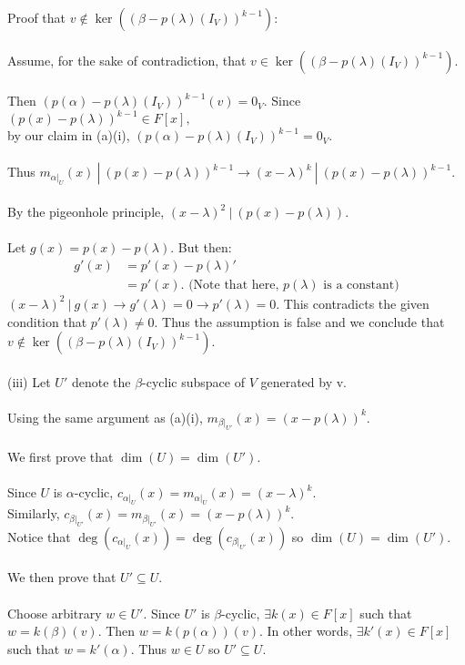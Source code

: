 \documentclass{article}
\begin{document}
Proof that $v \not \in \ker((\beta - p(\lambda)(I_V))^{k-1}):$\\\\
Assume, for the sake of contradiction, that $v \in \ker((\beta - p(\lambda)(I_V))^{k-1})$.\\\\
Then $(p(\alpha) - p(\lambda)(I_V))^{k-1}(v) = 0_V.$ Since $(p(x) - p(\lambda))^{k-1} \in F[x],$\\ by our claim in (a)(i), $(p(\alpha) - p(\lambda)(I_V))^{k-1} = 0_V.$\\\\
Thus $m_{\alpha|_U}(x) \ |\ (p(x)-p(\lambda))^{k-1} \to (x - \lambda)^k \ | \ (p(x) - p(\lambda))^{k-1}.$\\\\ By the pigeonhole principle, $(x-\lambda)^2\ | \ (p(x) - p(\lambda))$. \\\\ Let $g(x) = p(x) - p(\lambda)$. But then:\begin{align*}
g'(x) &= p'(x) - p(\lambda)' \\ &= p'(x). \text{ (Note that here, $p(\lambda)$ is a constant)}
\end{align*}
$(x - \lambda)^2 \ | \ g(x) \to  g'(\lambda) = 0 \to p'(\lambda) = 0.$
This contradicts the given condition that $p'(\lambda) \neq 0.$ Thus the assumption is false and we conclude that $v \not \in \ker((\beta - p(\lambda)(I_V))^{k-1})$.\\\\
(iii) Let $U'$ denote the $\beta$-cyclic subspace of $V$ generated by v.\\\\Using the same argument as (a)(i), $m_{\beta|_{U'}}(x) = (x - p(\lambda))^k.$\\\\We first prove that $\dim(U) = \dim(U').$\\\\ Since $U$ is $\alpha$-cyclic, $c_{\alpha|_U}(x) = m_{\alpha|_U}(x) = (x - \lambda)^k.$ \\Similarly, $c_{\beta|_{U'}}(x) = m_{\beta|_{U'}}(x) = (x - p(\lambda))^k.$\\
Notice that $\deg(c_{\alpha|_U}(x)) = \deg(c_{\beta|_{U'}}(x))$ so $\dim(U) = \dim(U').$\\\\We then prove that $U' \subseteq U.$\\\\
Choose arbitrary $w \in U'.$
Since $U'$ is $\beta$-cyclic, $\exists k(x) \in F[x]$ such that\\ $w = k(\beta)(v).$ Then $w = k( p(\alpha))(v)$. In other words, $\exists k'(x) \in F[x]$ such that $w = k'(\alpha).$ Thus $w \in U$ so $U' \subseteq U.$\\\\
\end{document}
